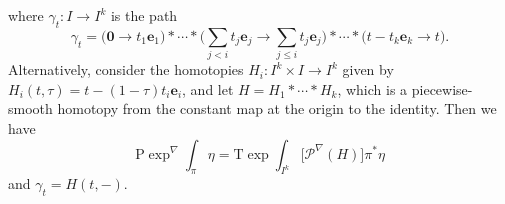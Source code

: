 where $\gamma_t \colon I \to I^k$ is the path
\begin{equation}
  \gamma_t = \Big(\mathbf{0} \to t_1 \mathbf{e}_1\Big) \ast \cdots \ast \Big(\textstyle{\sum_{j < i} t_j \mathbf{e}_j \to \sum_{j \leq i} t_j \mathbf{e}_j}\Big) \ast \cdots \ast \Big(t - t_k\mathbf{e}_k \to t\Big).
\end{equation}
Alternatively, consider the homotopies $H_i \colon I^k \times I \to I^k$ given by $H_i(t, \tau) = t - (1 -\tau) t_i\mathbf{e}_i$, and let $H = H_1 \ast \cdots \ast H_k$, which is a piecewise-smooth homotopy from the constant map at the origin to the identity. Then we have
\begin{equation}
   \mathrm{P}\exp^\nabla \! \int_\pi \eta = \mathrm{T} \exp \int_{I^k} \Big[\mathcal{P}^\nabla(H)\Big] \pi^* \eta 
\end{equation}
and $\gamma_t = H(t, -)$. 